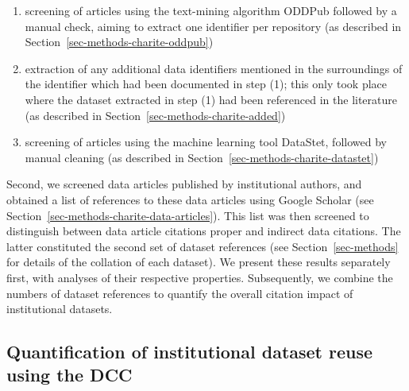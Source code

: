 \documentclass[
  letterpaper,
  DIV=11,
  numbers=noendperiod]{scrartcl}
\begin{document}
\begin{enumerate}
\def\labelenumi{(\arabic{enumi})}
\item
  screening of articles using the text-mining algorithm ODDPub followed
  by a manual check, aiming to extract one identifier per repository (as
  described in Section~\ref{sec-methods-charite-oddpub})
\item
  extraction of any additional data identifiers mentioned in the
  surroundings of the identifier which had been documented in step (1);
  this only took place where the dataset extracted in step (1) had been
  referenced in the literature (as described in
  Section~\ref{sec-methods-charite-added})
\item
  screening of articles using the machine learning tool DataStet,
  followed by manual cleaning (as described in
  Section~\ref{sec-methods-charite-datastet})
\end{enumerate}

Second, we screened data articles published by institutional authors,
and obtained a list of references to these data articles using Google
Scholar (see Section~\ref{sec-methods-charite-data-articles}). This list
was then screened to distinguish between data article citations proper
and indirect data citations. The latter constituted the second set of
dataset references (see Section~\ref{sec-methods} for details of the
collation of each dataset). We present these results separately first,
with analyses of their respective properties. Subsequently, we combine
the numbers of dataset references to quantify the overall citation
impact of institutional datasets.

\subsection{Quantification of institutional dataset reuse using the
DCC}\label{sec-results-quant}
\end{document}
